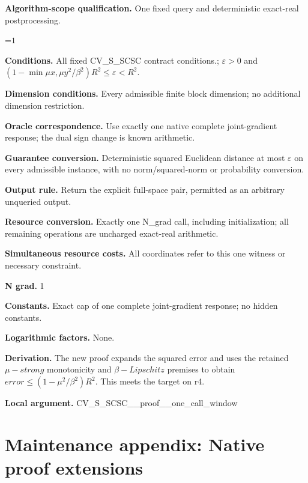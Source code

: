 \documentclass[10pt,a4paper]{article}
\newcommand{\AtlasMath}[1]{\par\begingroup\centering\setbox0=\hbox{$\displaystyle #1$}\ifdim\wd0>1.4\linewidth\typeout{ATLAS WIDE FORMULA: \the\wd0}\fi\ifdim\wd0>\linewidth\resizebox{\linewidth}{!}{\box0}\else\box0\fi\par\endgroup}
\begin{document}
\textbf{Algorithm-scope qualification.} One fixed query and deterministic exact-real postprocessing.



\AtlasMath{1}


\textbf{Conditions.} All fixed CV\_S\_SCSC contract conditions.; $\varepsilon >0$ and $(1-\min{\mu x,\mu y}^2/\beta ^2)R^2\le \varepsilon <R^2$.



\textbf{Dimension conditions.} Every admissible finite block dimension; no additional dimension restriction.



\textbf{Oracle correspondence.} Use exactly one native complete joint-gradient response; the dual sign change is known arithmetic.



\textbf{Guarantee conversion.} Deterministic squared Euclidean distance at most $\varepsilon$ on every admissible instance, with no norm/squared-norm or probability conversion.



\textbf{Output rule.} Return the explicit full-space pair, permitted as an arbitrary unqueried output.



\textbf{Resource conversion.} Exactly one N\_grad call, including initialization; all remaining operations are uncharged exact-real arithmetic.



\textbf{Simultaneous resource costs.} All coordinates refer to this one witness or necessary constraint.



\textbf{N grad.} 1



\textbf{Constants.} Exact cap of one complete joint-gradient response; no hidden constants.



\textbf{Logarithmic factors.} None.



\textbf{Derivation.} The new proof expands the squared error and uses the retained $\mu -strong$ monotonicity and $\beta -Lipschitz$ premises to obtain $error\le (1-\mu ^2/\beta ^2)R^2$. This meets the target on r4.



\textbf{Local argument.} CV\_S\_SCSC\_\_proof\_\_one\_call\_window



\section{Maintenance appendix: Native proof extensions}
\end{document}
